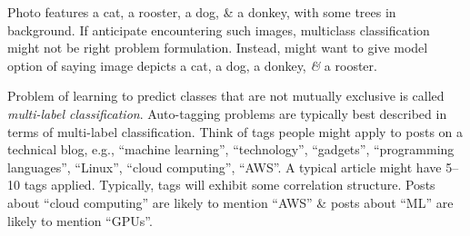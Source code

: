 \documentclass{article}
\begin{document}
\begin{itemize}
\begin{itemize}
\begin{itemize}
\begin{itemize}
				Photo features a cat, a rooster, a dog, \& a donkey, with some trees in background. If anticipate encountering such images, multiclass classification might not be right problem formulation. Instead, might want to give model option of saying image depicts a cat, a dog, a donkey, {\it\&} a rooster.

				Problem of learning to predict classes that are not mutually exclusive is called {\it multi-label classification}. Auto-tagging problems are typically best described in terms of multi-label classification. Think of tags people might apply to posts on a technical blog, e.g., ``machine learning'', ``technology'', ``gadgets'', ``programming languages'', ``Linux'', ``cloud computing'', ``AWS''. A typical article might have 5--10 tags applied. Typically, tags will exhibit some correlation structure. Posts about ``cloud computing'' are likely to mention ``AWS'' \& posts about ``ML'' are likely to mention ``GPUs''.


\end{itemize}
\end{itemize}
\end{itemize}
\end{itemize}
\end{document}
